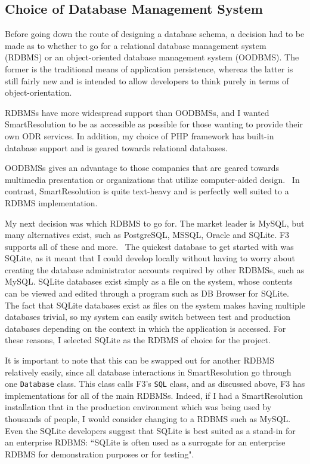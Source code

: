 \subsection{Choice of Database Management System}

Before going down the route of designing a database schema, a decision had to be made as to whether to go for a relational database management system (RDBMS) or an object-oriented database management system (OODBMS). The former is the traditional means of application persistence, whereas the latter is still fairly new and is intended to allow developers to think purely in terms of object-orientation.

RDBMSs have more widespread support than OODBMSs, and I wanted SmartResolution to be as accessible as possible for those wanting to provide their own ODR services. In addition, my choice of PHP framework has built-in database support and is geared towards relational databases.

OODBMSs gives an advantage to those companies that are geared towards multimedia presentation or organizations that utilize computer-aided design.~\cite{oodbms} In contrast, SmartResolution is quite text-heavy and is perfectly well suited to a RDBMS implementation.

My next decision was which RDBMS to go for. The market leader is MySQL, but many alternatives exist, such as PostgreSQL, MSSQL, Oracle and SQLite. F3 supports all of these and more.~\cite{f3:sqlConstructor} The quickest database to get started with was SQLite, as it meant that I could develop locally without having to worry about creating the database administrator accounts required by other RDBMSs, such as MySQL. SQLite databases exist simply as a file on the system, whose contents can be viewed and edited through a program such as DB Browser for SQLite. The fact that SQLite databases exist as files on the system makes having multiple databases trivial, so my system can easily switch between test and production databases depending on the context in which the application is accessed. For these reasons, I selected SQLite as the RDBMS of choice for the project.

It is important to note that this can be swapped out for another RDBMS relatively easily, since all database interactions in SmartResolution go through one \lstinline{Database} class. This class calls F3's \lstinline{SQL} class, and as discussed above, F3 has implementations for all of the main RDBMSs. Indeed, if I had a SmartResolution installation that in the production environment which was being used by thousands of people, I would consider changing to a RDBMS such as MySQL. Even the SQLite developers suggest that SQLite is best suited as a stand-in for an enterprise RDBMS: ``SQLite is often used as a surrogate for an enterprise RDBMS for demonstration purposes or for testing".~\cite{sqliteFeatures}

